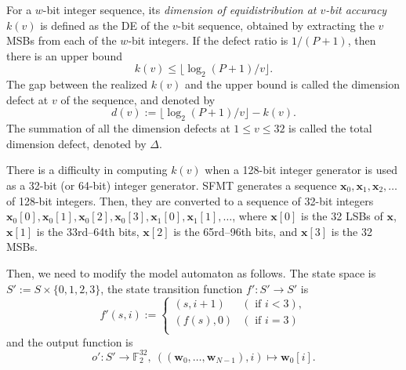 \documentclass{svmult}
\def\F2{{\mathbb F}_2}
\def\bx{{{\mathbf x}}}
\def\bw{{{\mathbf w}}}
\begin{document}
For a $w$-bit integer sequence, its {\em dimension of 
equidistribution at $v$-bit accuracy} $k(v)$
is defined as the DE of the $v$-bit sequence, obtained by extracting
the $v$ MSBs from each of the $w$-bit integers.
If the defect ratio is $1/(P+1)$, 
then there is an upper bound 
$$
k(v) \leq \lfloor \log_2 (P+1) / v \rfloor.
$$
The gap between the realized $k(v)$ and the upper bound is
called the dimension defect at $v$ of the sequence,
and denoted by
$$
d(v):=\lfloor \log_2 (P+1) / v \rfloor -k(v).
$$
The summation of all the dimension defects at
$1 \leq v \leq 32$ is called the total dimension defect, 
denoted by $\Delta$.

There is a difficulty in computing $k(v)$ when 
a 128-bit integer generator is used as a 32-bit 
(or 64-bit) integer generator.
SFMT generates a sequence
$\bx_0, \bx_1, \bx_2, \ldots$ of 128-bit integers. 
Then, they are converted to a sequence of 32-bit integers
$\bx_0[0], \bx_0[1], \bx_0[2], \bx_0[3], \bx_1[0], \bx_1[1],\ldots$,
where 
$\bx[0]$ is the 32 LSBs of $\bx$, 
$\bx[1]$ is the 33rd--64th bits,
$\bx[2]$ is the 65rd--96th bits,
and $\bx[3]$ is the 32 MSBs. 

Then, we need to modify the model automaton
as follows.
The state space is $S':=S \times \{0,1,2,3\}$,
the state transition function $f':S' \to S'$ is
$$
f'(s,i):=
\left\{
\begin{array}{cl}
(s, i+1) & (\mbox{ if $i<3$}), \\
(f(s), 0) & (\mbox{ if $i=3$}) \\
\end{array}
\right.
$$
and the output function is 
$$o': S' \to \F2^{32},\  ((\bw_0,\ldots,\bw_{N-1}),i) \mapsto \bw_0[i].$$
\end{document}
